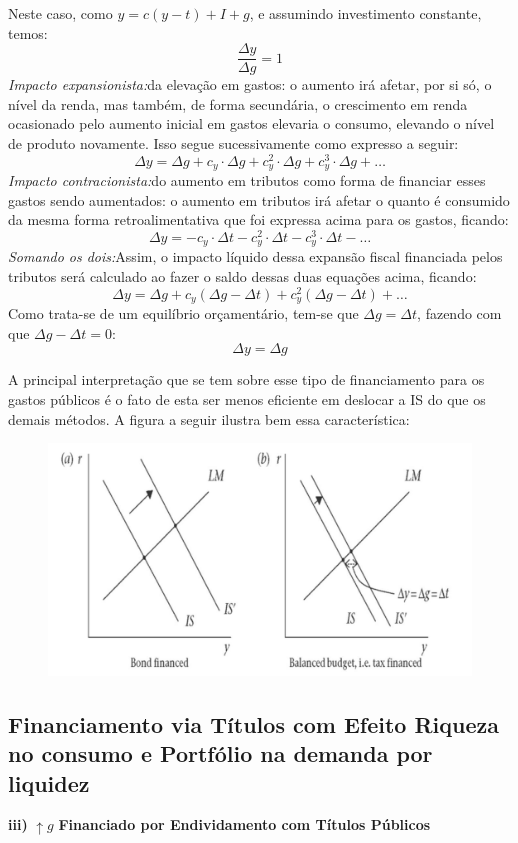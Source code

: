 \documentclass[a4paper,12pt]{article}[abntex2]
\begin{document}
Neste caso, como $y = c(y - t) + I + g$, e assumindo investimento constante, temos:
\[
\frac{\Delta y}{\Delta g} = 1
\]
\textit{Impacto expansionista:}da elevação em gastos: o aumento irá afetar, por si só, o nível da renda, mas também, de forma secundária, o crescimento em renda ocasionado pelo aumento inicial em  gastos  elevaria  o  consumo,  elevando  o  nível  de  produto  novamente.  Isso  segue sucessivamente como expresso a seguir: 
\[
\Delta y = \Delta g + c_y \cdot \Delta g + c_y^2 \cdot \Delta g + c_y^3 \cdot \Delta g + \dots
\]
\textit{Impacto contracionista:}do aumento em tributos como forma de financiar esses gastos sendo aumentados:  o  aumento  em  tributos  irá  afetar  o  quanto  é  consumido  da  mesma  forma retroalimentativa que foi expressa acima para os gastos, ficando: 
\[
\Delta y = -c_y \cdot \Delta t - c_y^2 \cdot \Delta t - c_y^3 \cdot \Delta t - \dots
\]
\textit{Somando os dois:}Assim, o impacto líquido dessa expansão fiscal financiada pelos tributos será calculado ao fazer o saldo dessas duas equações acima, ficando: 
\[
\Delta y = \Delta g + c_y(\Delta g - \Delta t) + c_y^2(\Delta g - \Delta t) + \dots
\]
Como  trata-se  de  um  equilíbrio  orçamentário,  tem-se  que $\Delta g = \Delta t$, fazendo  com  que  $\Delta g - \Delta t=0$:
\[
\Delta y = \Delta g
\]

A principal interpretação que se tem sobre esse tipo de financiamento para os gastos públicos é o fato de esta ser menos eficiente em deslocar a IS do que os demais métodos. A figura a seguir ilustra bem essa característica: 

\begin{figure}[H]
    \centering
    \includegraphics[width=0.7\linewidth]{Imagens/a18i2.png}
\end{figure}

\subsection{\textbf{Financiamento via Títulos com Efeito Riqueza no consumo e Portfólio na demanda por liquidez}}
\textbf{iii)} $\uparrow g$ \quad \textbf{Financiado por Endividamento com Títulos Públicos}
\end{document}
